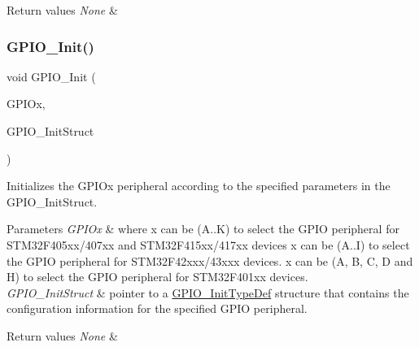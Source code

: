 \begin{DoxyRetVals}{Return values}
{\em None} & \\
\hline
\end{DoxyRetVals}
\mbox{\label{group___g_p_i_o___group1_ga71abf9404261370d03cca449b88d3a65}} 
\subsubsection{\texorpdfstring{G\+P\+I\+O\+\_\+\+Init()}{GPIO\_Init()}}
{\footnotesize\ttfamily void G\+P\+I\+O\+\_\+\+Init (\begin{DoxyParamCaption}\item[{G\+P\+I\+O\+\_\+\+Type\+Def $\ast$}]{G\+P\+I\+Ox,  }\item[{\mbox{\hyperlink{struct_g_p_i_o___init_type_def}{G\+P\+I\+O\+\_\+\+Init\+Type\+Def}} $\ast$}]{G\+P\+I\+O\+\_\+\+Init\+Struct }\end{DoxyParamCaption})}



Initializes the G\+P\+I\+Ox peripheral according to the specified parameters in the G\+P\+I\+O\+\_\+\+Init\+Struct. 


\begin{DoxyParams}{Parameters}
{\em G\+P\+I\+Ox} & where x can be (A..K) to select the G\+P\+IO peripheral for S\+T\+M32\+F405xx/407xx and S\+T\+M32\+F415xx/417xx devices x can be (A..I) to select the G\+P\+IO peripheral for S\+T\+M32\+F42xxx/43xxx devices. x can be (A, B, C, D and H) to select the G\+P\+IO peripheral for S\+T\+M32\+F401xx devices. ~\newline
\\
\hline
{\em G\+P\+I\+O\+\_\+\+Init\+Struct} & pointer to a \mbox{\hyperlink{struct_g_p_i_o___init_type_def}{G\+P\+I\+O\+\_\+\+Init\+Type\+Def}} structure that contains the configuration information for the specified G\+P\+IO peripheral. \\
\hline
\end{DoxyParams}

\begin{DoxyRetVals}{Return values}
{\em None} & \\
\hline
\end{DoxyRetVals}
\mbox{\label{group___g_p_i_o___group1_gad2f2e615928c69fd0d8c641a7cedaafc}} 
